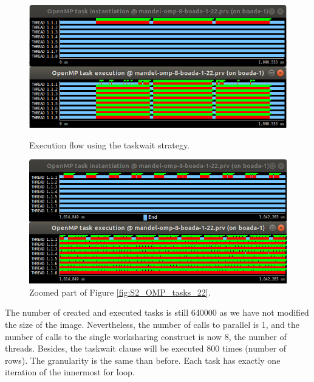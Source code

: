 \documentclass[12pt, a4paper]{article}
\begin{document}
\begin{figure}[H]
\begin{minipage}[t]{0.5\linewidth}
  \centering
  \includegraphics[scale=0.345]{./S2_OMP_tasks_22}
  \caption{Execution flow using the taskwait strategy.}
  \label{fig:S2_OMP_tasks_22}
\end{minipage}%
\hspace{0cm}
\begin{minipage}[t]{0.5\linewidth}
  \centering
  \includegraphics[scale=0.345]{./S2_OMP_tasks_22_zoom}
  \caption{Zoomed part of Figure \ref{fig:S2_OMP_tasks_22}.}
  \label{fig:S2_OMP_tasks_22_zoom}
\end{minipage}
\end{figure}


The number of created and executed tasks is still 640000 as we have not modified the size of the image. Nevertheless, the number of calls to parallel is 1, and the number of calls to the single worksharing construct is now 8, the number of threads. Besides, the taskwait clause will be executed 800 times (number of rows). The granularity is the same than before. Each task has exactly one iteration of the innermost for loop.
\end{document}
